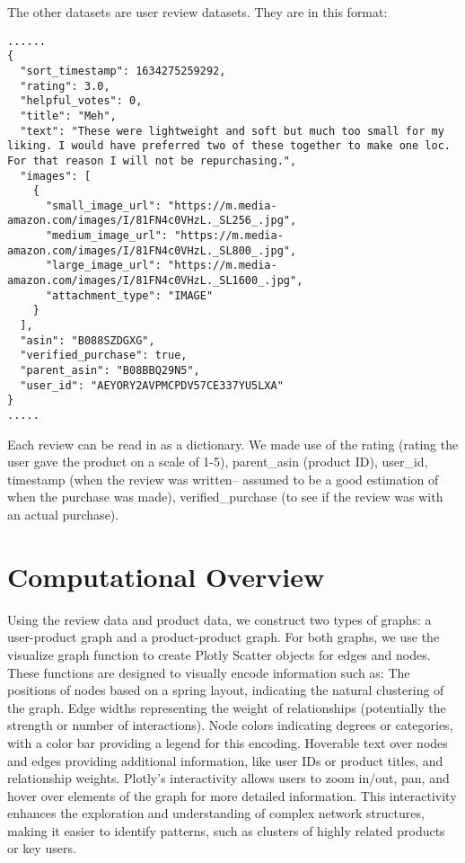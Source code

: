 \documentclass[fontsize=11pt]{article}
\begin{document}
\vspace{\baselineskip}
The other datasets are user review datasets. They are in this format:
\begin{verbatim}
......
{
  "sort_timestamp": 1634275259292,
  "rating": 3.0,
  "helpful_votes": 0,
  "title": "Meh",
  "text": "These were lightweight and soft but much too small for my liking. I would have preferred two of these together to make one loc. For that reason I will not be repurchasing.",
  "images": [
    {
      "small_image_url": "https://m.media-amazon.com/images/I/81FN4c0VHzL._SL256_.jpg",
      "medium_image_url": "https://m.media-amazon.com/images/I/81FN4c0VHzL._SL800_.jpg",
      "large_image_url": "https://m.media-amazon.com/images/I/81FN4c0VHzL._SL1600_.jpg",
      "attachment_type": "IMAGE"
    }
  ],
  "asin": "B088SZDGXG",
  "verified_purchase": true,
  "parent_asin": "B08BBQ29N5",
  "user_id": "AEYORY2AVPMCPDV57CE337YU5LXA"
}
.....
\end{verbatim}
Each review can be read in as a dictionary. We made use of the rating (rating the user gave the product on a scale of 1-5), parent\_asin (product ID), user\_id, timestamp (when the review was written-- assumed to be a good estimation of when the purchase was made), verified\_purchase (to see if the review was with an actual purchase).

\section*{Computational Overview}
Using the review data and product data, we construct two types of graphs: a user-product graph and a product-product graph. For both graphs, we use the visualize graph function to create Plotly Scatter objects for edges and nodes. These functions are designed to visually encode information such as: 
The positions of nodes based on a spring layout, indicating the natural clustering of the graph.
Edge widths representing the weight of relationships (potentially the strength or number of interactions).
Node colors indicating degrees or categories, with a color bar providing a legend for this encoding.
Hoverable text over nodes and edges providing additional information, like user IDs or product titles, and relationship weights. Plotly's interactivity allows users to zoom in/out, pan, and hover over elements of the graph for more detailed information. This interactivity enhances the exploration and understanding of complex network structures, making it easier to identify patterns, such as clusters of highly related products or key users.
\end{document}
